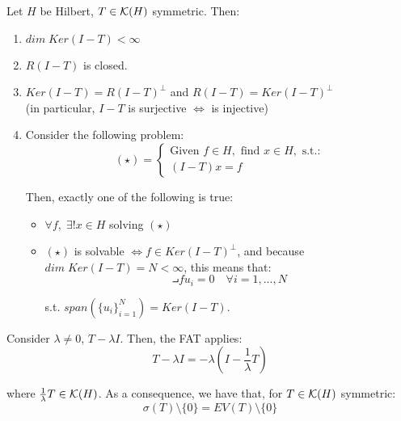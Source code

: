 \begin{ftheorem}
    Let $H$ be Hilbert, $T \in \mathcal{K}(H)$ symmetric. Then:
    \vspace{1em}
    \begin{enumerate}[label=(\roman*)]
        \item $dim \; Ker (I - T) < \infty$
        \vspace{1em}
        \item $R(I - T)$ is closed.
        \vspace{1em}
        \item $Ker (I - T) = R(I - T)^{\perp}$ and $R(I - T) = Ker(I - T)^{\perp}$\\
        (in particular, $I - T$ is surjective $\iff$ is injective)
        \vspace{1em}
        \item Consider the following problem:
        $$(\star) = \begin{cases}
            \text{Given } f \in H, \text{ find } x \in H, \text{ s.t.:}\\
            (I - T)x = f
        \end{cases}$$

        Then, exactly one of the following is true:
        \vspace{1em}
        \begin{itemize}
            \item $\forall f, \; \exists ! x \in H$ solving $(\star)$
            \vspace{1em}
            \item $(\star)$ is solvable $\iff f \in Ker(I - T)^{\perp}$, and because
            $dim \; Ker(I-T) = N < \infty$, this means that:
            $$\intprod{f}{u_i} = 0 \quad \forall i = 1, ..., N$$

            s.t. $span(\{u_i\}_{i=1}^N) = Ker(I-T)$. 
        \end{itemize}
        
    \end{enumerate}
\end{ftheorem}

\begin{fremark}
    Consider $\lambda \neq 0$, $T - \lambda I$. Then, the FAT applies:
    $$T - \lambda I = - \lambda (I - \frac{1}{\lambda}T)$$

    where $\frac{1}{\lambda}T \in \mathcal{K}(H)$. As a consequence, we have that, for 
    $T \in \mathcal{K}(H)$ symmetric:
    $$\sigma(T) \setminus \{0\} = EV(T) \setminus \{0\}$$
\end{fremark}

